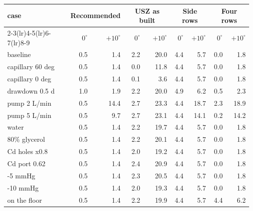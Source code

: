 \begin{tabular}{@{}l r r r r r r r r @{}}
\toprule
case & \multicolumn{2}{c}{Recommended} & \multicolumn{2}{c}{USZ as built} & \multicolumn{2}{c}{Side rows} & \multicolumn{2}{c}{Four rows} \\
\cmidrule(lr){2-3}\cmidrule(lr){4-5}\cmidrule(lr){6-7}\cmidrule(lr){8-9}
 & $0^\circ$ & $+10^\circ$ & $0^\circ$ & $+10^\circ$ & $0^\circ$ & $+10^\circ$ & $0^\circ$ & $+10^\circ$ \\
\midrule
baseline & 0.5 & 1.4 & 2.2 & 20.0 & 4.4 & 5.7 & 0.0 & 1.8 \\
capillary 60 deg & 0.5 & 1.4 & 0.0 & 11.8 & 4.4 & 5.7 & 0.0 & 1.8 \\
capillary 0 deg & 0.5 & 1.4 & 0.1 & 3.6 & 4.4 & 5.7 & 0.0 & 1.8 \\
drawdown 0.5 d & 1.0 & 1.9 & 2.2 & 20.0 & 4.9 & 6.2 & 0.5 & 2.3 \\
pump 2 L/min & 0.5 & 14.4 & 2.7 & 23.3 & 4.4 & 18.7 & 2.3 & 18.9 \\
pump 5 L/min & 0.5 & 9.7 & 2.7 & 23.1 & 4.4 & 14.1 & 0.2 & 14.2 \\
water & 0.5 & 1.4 & 2.2 & 19.7 & 4.4 & 5.7 & 0.0 & 1.8 \\
80\% glycerol & 0.5 & 1.4 & 2.2 & 20.1 & 4.4 & 5.7 & 0.0 & 1.8 \\
Cd holes x0.8 & 0.5 & 1.4 & 2.0 & 19.2 & 4.4 & 5.7 & 0.0 & 1.8 \\
Cd port 0.62 & 0.5 & 1.4 & 2.4 & 20.9 & 4.4 & 5.7 & 0.0 & 1.8 \\
-5 mmHg & 0.5 & 1.4 & 2.3 & 20.5 & 4.4 & 5.7 & 0.0 & 1.8 \\
-10 mmHg & 0.5 & 1.4 & 2.0 & 19.3 & 4.4 & 5.7 & 0.0 & 1.8 \\
on the floor & 0.5 & 1.4 & 2.2 & 19.9 & 4.4 & 5.7 & 4.4 & 6.2 \\
\bottomrule
\end{tabular}

